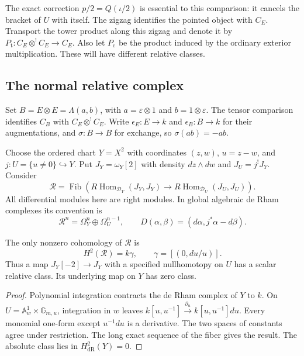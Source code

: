 The exact correction $p/2=Q(\iota/2)$ is essential to this
comparison: it cancels the bracket of $U$ with itself.
The zigzag identifies the pointed object with $C_E$.
Transport the tower product along this zigzag and denote
it by $P_{\mathrm t}:C_E\otimes^!C_E\to C_E$.
Also let $P_{\mathrm c}$ be the product induced by the
ordinary exterior multiplication. These will have
different relative classes.

\subsection{The normal relative complex}

Set $B=E\otimes E=\Lambda(a,b)$, with
$a=\varepsilon\otimes1$ and $b=1\otimes\varepsilon$.
The tensor comparison identifies $C_B$ with
$C_E\otimes^!C_E$. Write $\epsilon_E:E\to k$ and
$\epsilon_B:B\to k$ for their augmentations, and
$\sigma:B\to B$ for exchange, so $\sigma(ab)=-ab$.

Choose the ordered chart $Y=X^2$ with coordinates $(z,w)$,
$u=z-w$, and $j:U=\{u\ne0\}\hookrightarrow Y$.
Put $J_Y=\omega_Y[2]$ with density $dz\wedge dw$ and
$J_U=j^!J_Y$. Consider
\begin{equation}\label{cbc:rc:relative-complex}
 \mathcal R=\operatorname{Fib}\left(
 R\operatorname{Hom}_{\mathcal D_Y}(J_Y,J_Y)
 \longrightarrow
 R\operatorname{Hom}_{\mathcal D_U}(J_U,J_U)\right).
\end{equation}
All differential modules here are right modules. In global
algebraic de Rham complexes its convention is
\[
 \mathcal R^n=\Omega_Y^n\oplus\Omega_U^{n-1},
 \qquad D(\alpha,\beta)=(d\alpha,j^*\alpha-d\beta).
\]

\begin{lemma}\label{cbc:rc:relative-line}
The only nonzero cohomology of $\mathcal R$ is
\[
 H^2(\mathcal R)=k\gamma,
 \qquad \gamma=[(0,du/u)].
\]
Thus a map $J_Y[-2]\to J_Y$ with a specified nullhomotopy
on $U$ has a scalar relative class. Its underlying map on
$Y$ has zero class.
\end{lemma}
\begin{proof}
Polynomial integration contracts the de Rham complex of
$Y$ to $k$. On $U=\mathbb A^1_w\times\mathbb G_{m,u}$,
integration in $w$ leaves
$k[u,u^{-1}]\xrightarrow{\partial_u}k[u,u^{-1}]du$.
Every monomial one-form except $u^{-1}du$ is a derivative.
The two spaces of constants agree under restriction.
The long exact sequence of the fiber gives the result.
The absolute class lies in $H^2_{\mathrm{dR}}(Y)=0$.
\end{proof}

